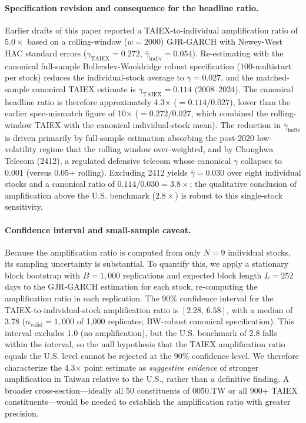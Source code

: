 \paragraph{Specification revision and consequence for the headline ratio.} Earlier drafts of this paper reported a TAIEX-to-individual amplification ratio of $5.0\times$ based on a rolling-window ($w = 2000$) GJR-GARCH with Newey-West HAC standard errors ($\gamma_{\text{TAIEX}}=0.272$, $\bar{\gamma}_{\text{indiv}}=0.054$). Re-estimating with the canonical full-sample Bollerslev-Wooldridge robust specification (100-multistart per stock) reduces the individual-stock average to $\bar{\gamma} = 0.027$, and the matched-sample canonical TAIEX estimate is $\gamma_{\text{TAIEX}}=0.114$ (2008--2024). The canonical headline ratio is therefore approximately 4.3$\times$ ($=0.114/0.027$), lower than the earlier spec-mismatch figure of 10$\times$ ($=0.272/0.027$, which combined the rolling-window TAIEX with the canonical individual-stock mean). The reduction in $\bar{\gamma}_{\text{indiv}}$ is driven primarily by full-sample estimation absorbing the post-2020 low-volatility regime that the rolling window over-weighted, and by Chunghwa Telecom (2412), a regulated defensive telecom whose canonical $\gamma$ collapses to 0.001 (versus 0.05+ rolling). Excluding 2412 yields $\bar{\gamma} = 0.030$ over eight individual stocks and a canonical ratio of $0.114/0.030 = 3.8\times$; the qualitative conclusion of amplification above the U.S. benchmark ($2.8\times$) is robust to this single-stock sensitivity.

\paragraph{Confidence interval and small-sample caveat.} Because the amplification ratio is computed from only $N = 9$ individual stocks, its sampling uncertainty is substantial. To quantify this, we apply a stationary block bootstrap \citep[Politis-Romano][]{politis1994} with $B=1{,}000$ replications and expected block length $L=252$ days to the GJR-GARCH estimation for each stock, re-computing the amplification ratio in each replication. The 90\% confidence interval for the TAIEX-to-individual-stock amplification ratio is $[2.28, \, 6.58]$, with a median of 3.78 ($n_{\text{valid}}=1{,}000$ of 1,000 replicates; BW-robust canonical specification). This interval excludes 1.0 (no amplification), but the U.S. benchmark of 2.8 falls within the interval, so the null hypothesis that the TAIEX amplification ratio equals the U.S. level cannot be rejected at the 90\% confidence level. We therefore characterize the 4.3$\times$ point estimate as \textit{suggestive evidence} of stronger amplification in Taiwan relative to the U.S., rather than a definitive finding. A broader cross-section---ideally all 50 constituents of 0050.TW or all 900+ TAIEX constituents---would be needed to establish the amplification ratio with greater precision.

